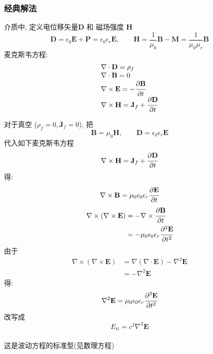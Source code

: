 \subsubsection{经典解法}

介质中, 定义电位移矢量$\mathbf{D}$ 和 磁场强度 $\mathbf{H}$
\[ \mathbf{D}=\epsilon_0 \mathbf{E} + \mathbf{P} = \epsilon_0 \epsilon_r \mathbf{E},  \qquad \mathbf{H}=\frac{1}{\mu_0} \mathbf{B} -\mathbf{M}= \frac{1}{\mu_0\mu_r}\mathbf{B} \]
麦克斯韦方程:
\[ \begin{array}{l}  
  \nabla \cdot \mathbf{D} =\rho _f \\  
  \nabla \cdot \mathbf{B} = 0 \\  
  \nabla \times  \mathbf{E} = -\cfrac{\partial \mathbf{B}}{\partial t }  \\  
  \nabla \times  \mathbf{H} = \mathbf{J}_f +  \cfrac{\partial \mathbf{D}}{\partial t }   
\end{array} \]

对于真空 ($\rho _f =0, \mathbf{J}_f =0 $), 把 \[ \mathbf{B} = \mu_0 \mathbf{H}, \qquad  \mathbf{D} = \epsilon_0 \epsilon_r \mathbf{E} \]
代入如下麦克斯韦方程
 \[ \nabla \times  \mathbf{H} = \mathbf{J}_f +  \cfrac{\partial \mathbf{D}}{\partial t } \]
得: \[ \nabla \times \mathbf{B} = \mu_0\epsilon_0 \epsilon_r \cfrac{\partial \mathbf{E}} {\partial t } \]
\[
\begin{aligned}
  \nabla \times (\nabla \times  \mathbf{E}) &= - \nabla \times \cfrac{\partial \mathbf{B}}{\partial t } \\
  &= - \mu_0\epsilon_0 \epsilon_r \cfrac{\partial ^2 \mathbf{E}} {\partial t^2 }
\end{aligned} \]
由于
  \[
  \begin{aligned}
      \nabla \times (\nabla \times  \mathbf{E}) &=  \nabla (\nabla \cdot  \mathbf{E})- \nabla^2 \mathbf{E} \\
      &= - \nabla^2 \mathbf{E} 
  \end{aligned} \]
  得:
  \[
  \nabla^2 \mathbf{E}= \mu_0\epsilon_0 \epsilon_r \cfrac{\partial ^2 \mathbf{E}} {\partial t^2 }\]
  改写成
  \[\boxed{E_{tt} =c^2\nabla^2 \mathbf{E}}\]
  ~~\\
  这是波动方程的标准型(见数理方程) \\

